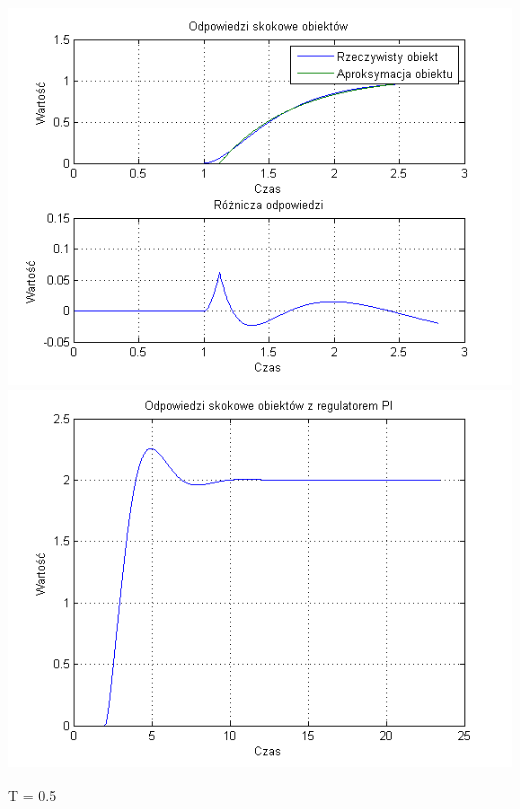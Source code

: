 \documentclass[10pt,a4paper]{article}
\begin{document}
\begin{center}
\includegraphics[scale=1]{images/jeden/skrypt_53.png}\\
\includegraphics[scale=1]{images/jeden/skrypt_54.png}\\
\end{center}
\newpage
T = 0.5
\end{document}
